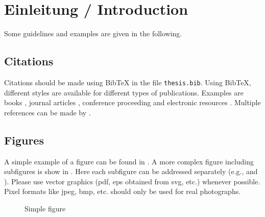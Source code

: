 
%

\tableofcontents
\listoffigures
\listoftables
\lstlistoflistings

\pagebreak
{}

\chapter{Einleitung / Introduction}

Some guidelines and examples are given in the following.

\section{Citations}

Citations should be made using BibTeX in the file \verb|thesis.bib|. 
Using BibTeX, different styles are available for different types of publications. Examples are books \cite{Adams90}, journal articles \cite{Zhang99}, conference proceeding \cite{Yee99} and 
electronic resources \cite{Fear05}. Multiple references can be made by \cite{Adams90,Zhang99,Yee99,Fear05}.


\section{Figures}

A simple example of a figure can be found in . A more complex figure including subfigures is show in . Here each subfigure can be addressed separately (e.g.,  and ). Please use vector graphics (pdf, eps obtained from svg, etc.) whenever possible. Pixel formats like jpeg, bmp, etc. should only be used for real photographs.

\begin{figure}[!h]
	\centering
  \fbox{\parbox{5cm}{\centering ~\vspace{1.5cm}\\Dummy\\~\vspace{1.5cm}}} %
  \caption{Simple figure}
  \label{fig:simple_figure}
\end{figure}

